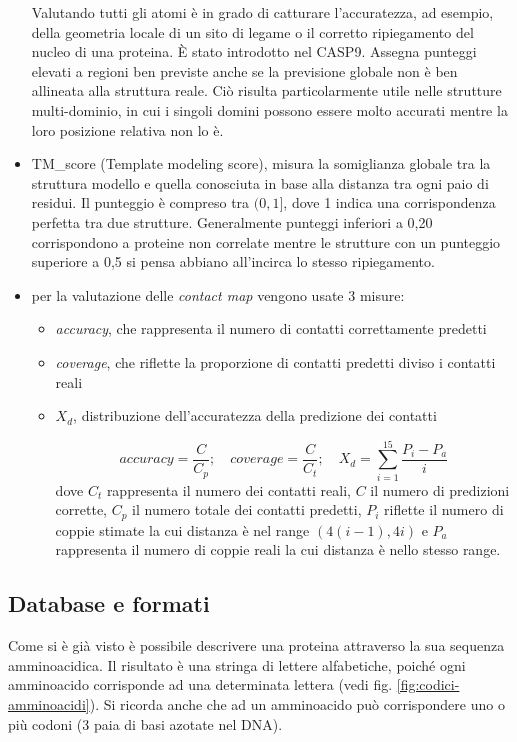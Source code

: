 \begin{itemize}
	\par Valutando tutti gli atomi è in grado di catturare l'accuratezza, ad esempio, della geometria locale di un sito di legame o il corretto ripiegamento del nucleo di una proteina. È stato introdotto nel CASP9. Assegna punteggi elevati a regioni ben previste anche se la previsione globale non è ben allineata alla struttura reale. Ciò risulta particolarmente utile nelle strutture multi-dominio, in cui i singoli domini possono essere molto accurati mentre la loro posizione relativa non lo è.
	
	\item TM\_score (Template modeling score), misura la somiglianza globale tra la struttura modello e quella conosciuta in base alla distanza tra ogni paio di residui. Il punteggio è compreso tra $(0, 1]$, dove 1 indica una corrispondenza perfetta tra due strutture. Generalmente punteggi inferiori a 0,20 corrispondono a proteine non correlate mentre le strutture con un punteggio superiore a 0,5 si pensa abbiano all'incirca lo stesso ripiegamento.\\
	
	\item per la valutazione delle \textit{contact map} vengono usate 3 misure:
	\begin{itemize}
		\item \textit{accuracy}, che rappresenta il numero di contatti correttamente predetti
		\item \textit{coverage}, che riflette la proporzione di contatti predetti diviso i contatti reali
		\item $X_{d}$, distribuzione dell'accuratezza della predizione dei contatti
		
					\[ accuracy=\frac{C}{C_{p}}; \quad coverage=\frac{C}{C_{t}}; \quad X_{d}=\sum_{i=1}^{15} \frac{P_{i}-P_{a}}{i} \]
		dove $C_{t}$ rappresenta il numero dei contatti reali, $C$ il numero di predizioni corrette, $C_{p}$ il numero totale dei contatti predetti, $P_{i}$ riflette il numero di coppie stimate la cui distanza è nel range $(4(i-1), 4i)$ e $P_{a}$ rappresenta il numero di coppie reali la cui distanza è nello stesso range.
	\end{itemize}
\end{itemize}


\subsection{Database e formati} \label{sec:database}

Come si è già visto è possibile descrivere una proteina attraverso la sua sequenza amminoacidica. Il risultato è una stringa di lettere alfabetiche, poiché ogni amminoacido corrisponde ad una determinata lettera (vedi fig. \ref{fig:codici-amminoacidi}). Si ricorda anche che ad un amminoacido può corrispondere uno o più codoni (3 paia di basi azotate nel DNA). \\

